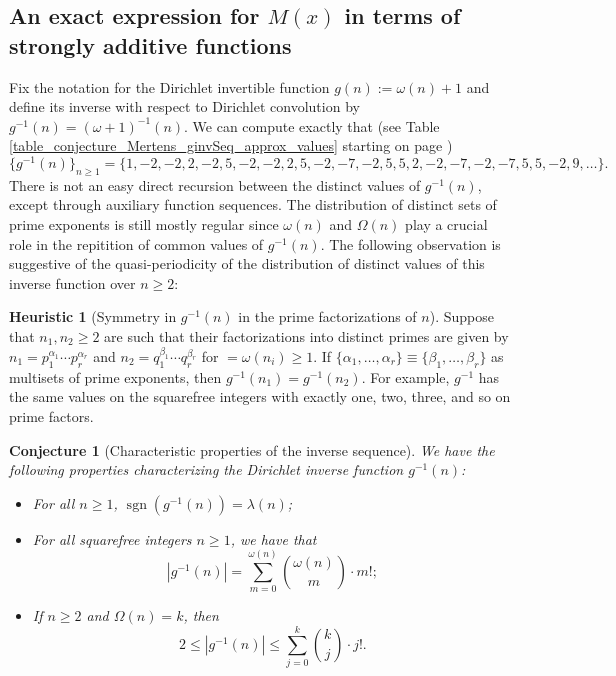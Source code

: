 \documentclass[11pt,reqno,a4letter]{article}
\numberwithin{figure}{section}
\numberwithin{table}{section}
\theoremstyle{plain}
\newtheorem{conjecture}[theorem]{Conjecture}
\numberwithin{theorem}{section}
\theoremstyle{definition}
\newtheorem{heuristic}[theorem]{Heuristic}
\newcommand{\NBRef}[1]{}
\begin{document}
\subsection{An exact expression for $M(x)$ in terms of strongly additive functions} 
\label{example_InvertingARecRelForMx_Intro}

Fix the notation for the Dirichlet invertible function $g(n) := \omega(n) + 1$ and define its 
inverse with respect to Dirichlet convolution by $g^{-1}(n) = (\omega+1)^{-1}(n)$. 
We can compute exactly that 
(see Table \ref{table_conjecture_Mertens_ginvSeq_approx_values} starting on page 
\pageref{table_conjecture_Mertens_ginvSeq_approx_values}) 
\[
\{g^{-1}(n)\}_{n \geq 1} = \{1, -2, -2, 2, -2, 5, -2, -2, 2, 5, -2, -7, -2, 5, 5, 2, -2, -7, -2, 
     -7, 5, 5, -2, 9, \ldots \}. 
\] 
There is not an easy 
direct recursion between the distinct values of $g^{-1}(n)$, except 
through auxiliary function sequences. 
The distribution of distinct sets of prime exponents is still mostly regular since 
$\omega(n)$ and $\Omega(n)$ play a crucial role in the repitition of common values of 
$g^{-1}(n)$. 
The following observation is suggestive of the quasi-periodicity of the distribution of 
distinct values of this inverse function over $n \geq 2$: 

\begin{heuristic}[Symmetry in $g^{-1}(n)$ in the prime factorizations of $n$] 
\label{heuristic_SymmetryIngInvFuncs} 
Suppose that $n_1, n_2 \geq 2$ are such that their factorizations into distinct primes are 
given by $n_1 = p_1^{\alpha_1} \cdots p_r^{\alpha_r}$ and $n_2 = q_1^{\beta_1} \cdots q_r^{\beta_r}$ 
for $ = \omega(n_i) \geq 1$. 
If $\{\alpha_1, \ldots, \alpha_r\} \equiv \{\beta_1, \ldots, \beta_r\}$ as multisets of prime exponents, 
then $g^{-1}(n_1) = g^{-1}(n_2)$. For example, $g^{-1}$ has the same values on the squarefree integers 
with exactly one, two, three, and so on prime factors.  
\end{heuristic} 

\NBRef{A01-2020-04-26}
\begin{conjecture}[Characteristic properties of the inverse sequence] 
\label{lemma_gInv_MxExample} 
We have the following properties characterizing the 
Dirichlet inverse function $g^{-1}(n)$: 
\begin{itemize} 

\item[\textbf{(A)}] For all $n \geq 1$, $\operatorname{sgn}(g^{-1}(n)) = \lambda(n)$; 
\item[\textbf{(B)}] For all squarefree integers $n \geq 1$, we have that 
     \[
     |g^{-1}(n)| = \sum_{m=0}^{\omega(n)} \binom{\omega(n)}{m} \cdot m!; 
     \]
\item[\textbf{(C)}] If $n \geq 2$ and $\Omega(n) = k$, then 
     \[
     2 \leq |g^{-1}(n)| \leq \sum_{j=0}^{k} \binom{k}{j} \cdot j!. 
     \]
\end{itemize} 
\end{conjecture} 
\end{document}
